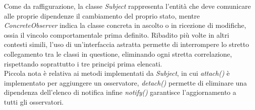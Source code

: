 \documentclass{article}
\begin{document}
Come da raffigurazione, la classe \textit{Subject} rappresenta l'entità che deve comunicare alle proprie dipendenze il cambiamento del proprio stato, mentre \textit{ConcreteObserver} indica la classe concreta in ascolto o in ricezione di modifiche, ossia il vincolo comportamentale prima definito. Ribadito più volte in altri contesti simili, l'uso di un'interfaccia astratta permette di interrompere lo stretto collegamento tra le classi in questione, eliminando ogni stretta correlazione, rispettando soprattutto i tre principi prima elencati.\vspace*{7pt}\\
Piccola nota è relativa ai metodi implementati da \textit{Subject}, in cui \textit{attach()} è implementato per aggiungere un osservatore, \textit{detach()} permette di eliminare una dipendenza dell'elenco di notifica infine \textit{notify()} garantisce l'aggiornamento a tutti gli osservatori. 
\end{document}

